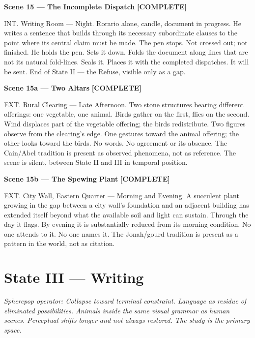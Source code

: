 \documentclass[12pt, oneside]{amsart}
\newcommand{\statuscomplete}{{\small\bfseries\color{complete}[COMPLETE]}}
\begin{document}
\bigskip

\noindent\textbf{Scene 15 --- The Incomplete Dispatch} \statuscomplete

\noindent INT. Writing Room --- Night. Rorario alone, candle, document in progress. He writes a sentence that builds through its necessary subordinate clauses to the point where its central claim must be made. The pen stops. Not crossed out; not finished. He holds the pen. Sets it down. Folds the document along lines that are not its natural fold-lines. Seals it. Places it with the completed dispatches. It will be sent. End of State II --- the Refuse, visible only as a gap.

\bigskip

\noindent\textbf{Scene 15a --- Two Altars} \statuscomplete

\noindent EXT. Rural Clearing --- Late Afternoon. Two stone structures bearing different offerings: one vegetable, one animal. Birds gather on the first, flies on the second. Wind displaces part of the vegetable offering; the birds redistribute. Two figures observe from the clearing's edge. One gestures toward the animal offering; the other looks toward the birds. No words. No agreement or its absence. The Cain/Abel tradition is present as observed phenomena, not as reference. The scene is silent, between State II and III in temporal position.

\bigskip

\noindent\textbf{Scene 15b --- The Spewing Plant} \statuscomplete

\noindent EXT. City Wall, Eastern Quarter --- Morning and Evening. A succulent plant growing in the gap between a city wall's foundation and an adjacent building has extended itself beyond what the available soil and light can sustain. Through the day it flags. By evening it is substantially reduced from its morning condition. No one attends to it. No one names it. The Jonah/gourd tradition is present as a pattern in the world, not as citation.

\section{State III — Writing}

\noindent\textit{Spherepop operator: Collapse toward terminal constraint. Language as residue of eliminated possibilities. Animals inside the same visual grammar as human scenes. Perceptual shifts longer and not always restored. The study is the primary space.}
\end{document}
